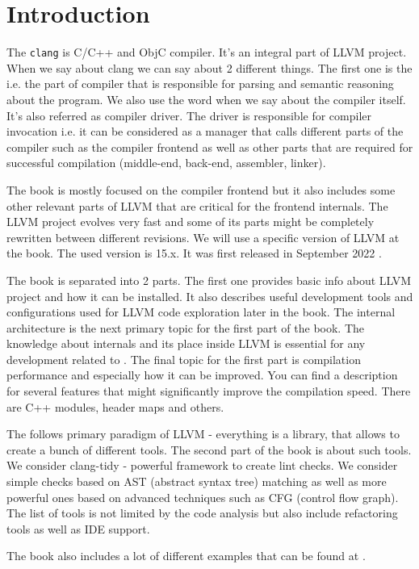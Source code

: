 \chapter*{Introduction}

The \texttt{clang} is C/C++ and ObjC compiler. It's an
integral part of LLVM 
project. When we say about clang we can say about 2 different
things. The first one is the  i.e. the part of
compiler that is responsible for parsing and semantic reasoning about
the program. We also use the word \clang when we say
about the compiler itself. It's also referred as compiler driver. The
driver is responsible for compiler invocation i.e. it can be
considered as a manager that calls different parts of the
compiler such as the compiler
frontend as well as other parts that are required for successful
compilation (middle-end, back-end, assembler, linker).

The book is mostly focused on the \clang compiler
frontend but it also includes some other relevant parts of
LLVM that are critical for the frontend internals. The LLVM project evolves
very fast and some of its parts might be completely rewritten between different
revisions. We will use a specific version of LLVM at the book. The used version
is 15.x. It was first released in September 2022
\cite{llvm:releases} \label{c:release15}.  

The book is separated into 2 parts. The first one provides basic
info about LLVM project and how it can be installed. It also describes
useful development tools and configurations used for LLVM code
exploration later in the book. The internal \clang architecture is the next
primary topic for the first part of the book. The knowledge about \clang
internals and its place inside LLVM is essential for any development related to
\clang. The final topic for the first part is compilation performance and
especially how it can be improved. You can find a description for several \clang
features that might significantly improve the compilation speed. There are C++ modules, header maps and others.

The \clang follows primary paradigm of LLVM -
everything is a library, that allows to create a bunch of different
tools. The second part of the book is about such tools. We consider clang-tidy -
powerful framework to create lint checks. We consider simple checks based on AST
(abstract syntax tree) matching as well as more powerful ones based on advanced
techniques such as CFG (control flow graph). The list of tools is not limited by
the code analysis but also include refactoring tools as well as IDE support.


The book also includes a lot of different examples that can be found at
\cite{github:clangbook_src}.
